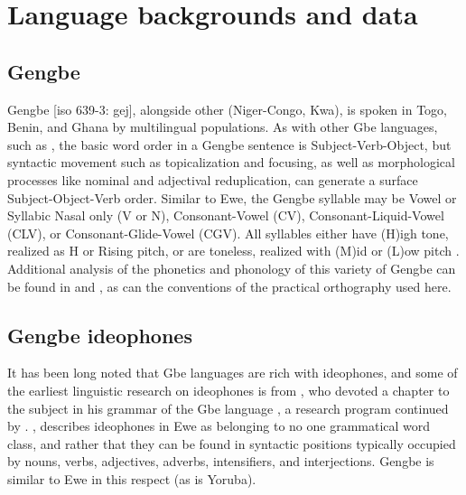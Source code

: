 \documentclass[output=paper,colorlinks,citecolor=brown]{langscibook}
\begin{document}
\section{Language backgrounds and data}\label{Sec-LangBackgrounds}

\subsection{Gengbe}

Gengbe [iso 639-3: gej], alongside other  (Niger-Congo, Kwa), is spoken in Togo, Benin, and Ghana by multilingual populations. As with other Gbe languages, such as , the basic word order in a Gengbe sentence is Subject-Verb-Object, but syntactic movement such as topicalization and focusing, as well as morphological processes like nominal and adjectival reduplication, can generate a surface Subject-Object-Verb order. Similar to Ewe, the Gengbe syllable may be Vowel or Syllabic Nasal only (V or N), Consonant-Vowel (CV), Consonant-Liquid-Vowel (CLV), or Consonant-Glide-Vowel (CGV). All syllables either have (H)igh tone, realized as H or Rising pitch, or are toneless, realized with (M)id or (L)ow pitch \citep{Bole-Richard1983}. Additional analysis of the phonetics and phonology of this variety of Gengbe can be found in \citet{Lotven&Obeng2018} and \citet{Lotven2020}, as can the conventions of the practical orthography used here.

\subsection{Gengbe ideophones}
\label{Gengbe Ideophones}

It has been long noted that Gbe languages are rich with ideophones, and some of the earliest linguistic research on ideophones is from \citet{Schlegel1857}, who devoted a chapter to the subject in his grammar of the Gbe language , a research program continued by \citet{Westermann1905, Westermann1907}. \citet{Ameka2001}, describes ideophones in Ewe as belonging to no one grammatical word class, and rather that they can be found in syntactic positions typically occupied by nouns, verbs, adjectives, adverbs, intensifiers, and interjections. Gengbe is similar to Ewe in this respect (as is Yoruba). 
\end{document}

